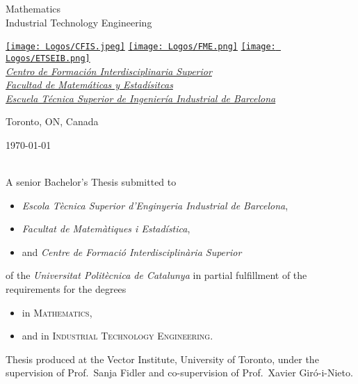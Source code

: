 \begin{titlepage}
  \vfill

  \Large
  Mathematics \\
  Industrial Technology Engineering

  \vfill

  \large
  \href{https://href.com}{\texttt{[image: Logos/CFIS.jpeg]}}
  \hspace{2em}
  \href{https://href.com}{\texttt{[image: Logos/FME.png]}}
  \hspace{2em}
  \href{https://href.com}{\texttt{[image: Logos/ETSEIB.png]}} \\[1ex]
  {\slshape
  \href{https://href.com}{Centro de Formación Interdisciplinaria Superior} \\
  \href{https://href.com}{Facultad de Matemáticas y Estadísitcas} \\
  \href{https://href.com}{Escuela Técnica Superior de Ingeniería Industrial de Barcelona}}

  \vfill

  Toronto, ON, Canada \hfill \@date

  \makeatother
\end{titlepage}


\thispagestyle{plain}
\null
\vfill
\begin{sloppypar}
  \makeatletter
  \noindent \@author{} \textcopyright{} \today \\
  \texttt{\@title} \\
  \makeatother
\end{sloppypar}

\noindent A senior Bachelor's Thesis submitted to
\begin{itemize}
  \item \textsl{Escola Tècnica Superior d'Enginyeria Industrial de Barcelona},
  \item \textsl{Facultat de Matemàtiques i Estadística},
  \item and \textsl{Centre de Formació Interdisciplinària Superior}
\end{itemize}
of the \textit{Universitat Politècnica de Catalunya} in partial fulfillment of
the requirements for the degrees
\begin{itemize}
  \item in \textsc{Mathematics},
  \item and in \textsc{Industrial Technology Engineering}. \\
\end{itemize}

\noindent Thesis produced at the Vector Institute, University of Toronto, under
the supervision of Prof.\ Sanja Fidler and co-supervision of Prof.\ Xavier
Giró-i-Nieto. \\

